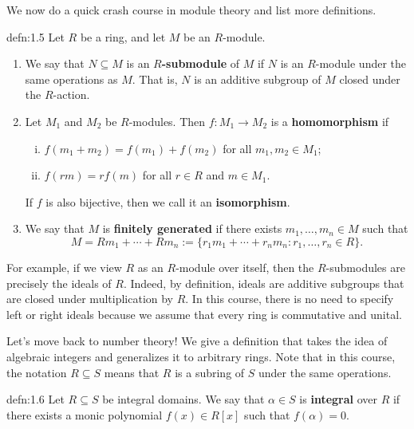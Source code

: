 We now do a quick crash course in module theory and list more definitions.

\begin{defn}{defn:1.5}
    Let $R$ be a ring, and let $M$ be an $R$-module.
    \begin{enumerate}[(1)]
        \item We say that $N \subseteq M$ is an {\bf $R$-submodule} of $M$ 
        if $N$ is an $R$-module under the same operations as $M$. That is, 
        $N$ is an additive subgroup of $M$ closed under the $R$-action. 

        \item Let $M_1$ and $M_2$ be $R$-modules. Then $f : M_1 \to M_2$ 
        is a {\bf homomorphism} if 
        \begin{enumerate}[(i)]
            \item $f(m_1 + m_2) = f(m_1) + f(m_2)$ for all $m_1, m_2 \in M_1$; 
            \item $f(rm) = rf(m)$ for all $r \in R$ and $m \in M_1$. 
        \end{enumerate}
        If $f$ is also bijective, then we call it an {\bf isomorphism}. 
        
        \item We say that $M$ is {\bf finitely generated} if there exists 
        $m_1, \dots, m_n \in M$ such that 
        \[ M = Rm_1 + \cdots + Rm_n := \{r_1 m_1 + 
        \cdots + r_n m_n : r_1, \dots, r_n \in R\}. \] 
    \end{enumerate}
\end{defn}\vspace{-0.25cm}

For example, if we view $R$ as an $R$-module over itself, then the $R$-submodules 
are precisely the ideals of $R$. Indeed, by definition, ideals are 
additive subgroups that are closed under multiplication by $R$. In this course, 
there is no need to specify left or right ideals because we assume that every 
ring is commutative and unital.

Let's move back to number theory! We give a definition that takes the idea of 
algebraic integers and generalizes it to arbitrary rings. Note that 
in this course, the notation $R \subseteq S$ means that $R$ is a subring of $S$ 
under the same operations. 

\begin{defn}{defn:1.6}
    Let $R \subseteq S$ be integral domains. We say that $\alpha \in S$ 
    is {\bf integral} over $R$ if there exists a monic polynomial 
    $f(x) \in R[x]$ such that $f(\alpha) = 0$.
\end{defn}\vspace{-0.25cm}

